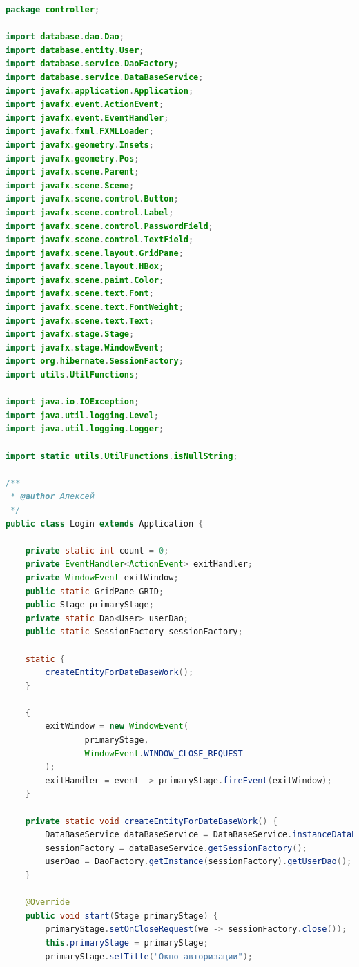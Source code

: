 \documentclass[a4paper,12pt]{article}
\begin{document}
\begin{lstlisting}[language=java, caption=код модуля Login.java]
package controller;

import database.dao.Dao;
import database.entity.User;
import database.service.DaoFactory;
import database.service.DataBaseService;
import javafx.application.Application;
import javafx.event.ActionEvent;
import javafx.event.EventHandler;
import javafx.fxml.FXMLLoader;
import javafx.geometry.Insets;
import javafx.geometry.Pos;
import javafx.scene.Parent;
import javafx.scene.Scene;
import javafx.scene.control.Button;
import javafx.scene.control.Label;
import javafx.scene.control.PasswordField;
import javafx.scene.control.TextField;
import javafx.scene.layout.GridPane;
import javafx.scene.layout.HBox;
import javafx.scene.paint.Color;
import javafx.scene.text.Font;
import javafx.scene.text.FontWeight;
import javafx.scene.text.Text;
import javafx.stage.Stage;
import javafx.stage.WindowEvent;
import org.hibernate.SessionFactory;
import utils.UtilFunctions;

import java.io.IOException;
import java.util.logging.Level;
import java.util.logging.Logger;

import static utils.UtilFunctions.isNullString;

/**
 * @author Алексей
 */
public class Login extends Application {

    private static int count = 0;
    private EventHandler<ActionEvent> exitHandler;
    private WindowEvent exitWindow;
    public static GridPane GRID;
    public Stage primaryStage;
    private static Dao<User> userDao;
    public static SessionFactory sessionFactory;

    static {
        createEntityForDateBaseWork();
    }

    {
        exitWindow = new WindowEvent(
                primaryStage,
                WindowEvent.WINDOW_CLOSE_REQUEST
        );
        exitHandler = event -> primaryStage.fireEvent(exitWindow);
    }

    private static void createEntityForDateBaseWork() {
        DataBaseService dataBaseService = DataBaseService.instanceDataBaseService();
        sessionFactory = dataBaseService.getSessionFactory();
        userDao = DaoFactory.getInstance(sessionFactory).getUserDao();
    }

    @Override
    public void start(Stage primaryStage) {
        primaryStage.setOnCloseRequest(we -> sessionFactory.close());
        this.primaryStage = primaryStage;
        primaryStage.setTitle("Окно авторизации");


\end{lstlisting}
\end{document}
